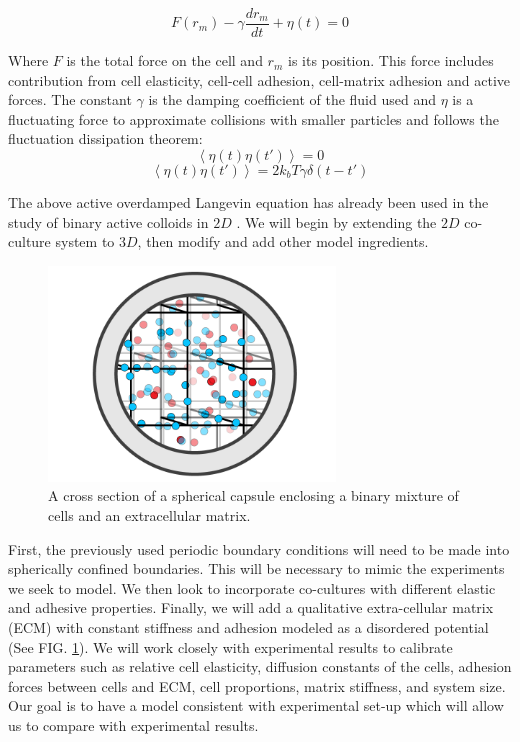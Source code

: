 \documentclass[aps,prb,twocolumn,groupedaddress,nofootinbib,floatfix]{revtex4}
\begin{document}
\begin{equation}
F(r _m) - \gamma \frac{dr_m}{dt} + \eta(t) = 0
\end{equation}

Where $F$ is the total force on the cell and $r_m$ is its position.
This force includes contribution from cell elasticity,
cell-cell adhesion, cell-matrix adhesion and active forces.
The constant $\gamma$ is the damping coefficient of the fluid used and $\eta$ is a fluctuating force to approximate collisions with smaller particles and follows the fluctuation dissipation theorem:
\vspace{0.3in}
\begin{equation}
\left\langle \eta(t)\eta(t')\right\rangle = 0 
\end{equation}
\begin{equation}
\left\langle \eta(t)\eta(t')\right\rangle = 2k_bT\gamma
\delta(t-t')
\end{equation}

The above active overdamped Langevin equation \cite{RednerBaskaran,FilyMarchetti} has already been used in the study of binary active colloids in $2D$ \cite{Butcher}. 
We will begin by extending the $2D$ co-culture system to $3D$, then modify and add other model ingredients.

\begin{figure}
  \includegraphics[width=3in]{Fig2.png}
  \caption[capsuleECM]
   {A cross section of a spherical capsule enclosing a binary mixture of 
   cells and an extracellular matrix.}
   \label{fig:capsuleECM}
\end{figure}

First, the previously used periodic boundary conditions will need to be made into spherically confined boundaries.
This will be necessary to mimic the experiments we seek to model.
We then look to incorporate co-cultures with different elastic and adhesive properties. 
Finally, we will add a qualitative extra-cellular matrix (ECM) with constant stiffness and adhesion modeled as a disordered potential (See FIG. \ref{fig:capsuleECM}). 
We will work closely with experimental results to calibrate parameters such as relative cell elasticity, diffusion constants of the cells, adhesion forces between cells and ECM, cell proportions, matrix stiffness, and system size.
Our goal is to have a model consistent with experimental set-up which will allow us to compare with experimental results.
\end{document}
